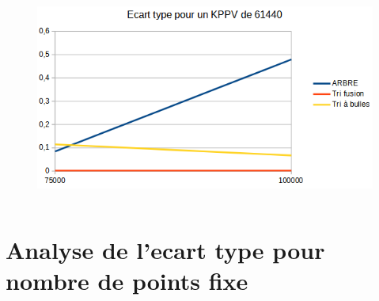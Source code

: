 \documentclass{beamer}
\begin{document}
\begin{frame}
\begin{columns}
    \begin{figure}
      \includegraphics[width=\textwidth]{Beamer/ET_KPPV_61440.png}
    \end{figure}
\end{columns}
\end{frame}

\section{Analyse de l'ecart type pour nombre de points fixe}
\end{document}
